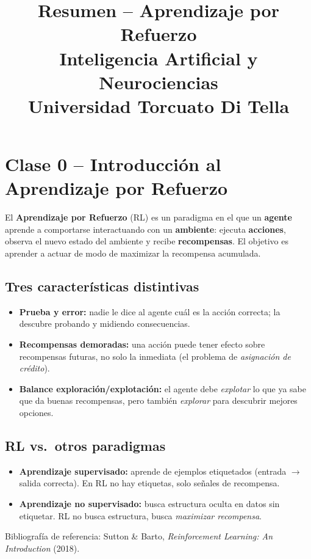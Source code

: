 \documentclass[11pt, a4paper]{article}
\title{\textbf{Resumen -- Aprendizaje por Refuerzo} \\
\large Inteligencia Artificial y Neurociencias \\ Universidad Torcuato Di Tella}
\author{}
\date{}
\begin{document}
\maketitle

\section{Clase 0 -- Introducci\'on al Aprendizaje por Refuerzo}

El \textbf{Aprendizaje por Refuerzo} (RL) es un paradigma en el que un \textbf{agente} aprende a comportarse interactuando con un \textbf{ambiente}: ejecuta \textbf{acciones}, observa el nuevo estado del ambiente y recibe \textbf{recompensas}. El objetivo es aprender a actuar de modo de maximizar la recompensa acumulada.

\subsection{Tres caracter\'isticas distintivas}
\begin{itemize}[nosep]
    \item \textbf{Prueba y error:} nadie le dice al agente cu\'al es la acci\'on correcta; la descubre probando y midiendo consecuencias.
    \item \textbf{Recompensas demoradas:} una acci\'on puede tener efecto sobre recompensas futuras, no solo la inmediata (el problema de \emph{asignaci\'on de cr\'edito}).
    \item \textbf{Balance exploraci\'on/explotaci\'on:} el agente debe \emph{explotar} lo que ya sabe que da buenas recompensas, pero tambi\'en \emph{explorar} para descubrir mejores opciones.
\end{itemize}

\subsection{RL vs.\ otros paradigmas}
\begin{itemize}[nosep]
    \item \textbf{Aprendizaje supervisado:} aprende de ejemplos etiquetados (entrada $\to$ salida correcta). En RL no hay etiquetas, solo se\~nales de recompensa.
    \item \textbf{Aprendizaje no supervisado:} busca estructura oculta en datos sin etiquetar. RL no busca estructura, busca \emph{maximizar recompensa}.
\end{itemize}
Bibliograf\'ia de referencia: Sutton \& Barto, \textit{Reinforcement Learning: An Introduction} (2018).
\end{document}
